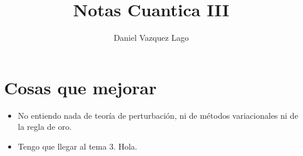 \documentclass[11pt]{book}
\author{Daniel Vazquez Lago}
\title{Notas Cuantica III}
\theoremstyle{definition}
\theoremstyle{theorem}
\numberwithin{equation}{section}
\numberwithin{figure}{chapter}
\begin{document}
\maketitle
\newpage
\tableofcontents
\newpage














\chapter*{Cosas que mejorar}

\begin{itemize}
	\item No entiendo nada de teoría de perturbación, ni de métodos variacionales ni de la regla de oro.
	\item Tengo que llegar al tema 3. Hola.
\end{itemize}
\end{document}
